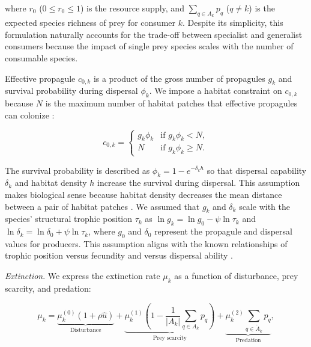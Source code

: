 \documentclass[11pt, class=article, crop=false]{standalone}
\begin{document}
where $r_0$ ($0 \le r_0 \le 1$) is the resource supply, and $\sum_{q \in A_{k}} p_{q}$ ($q \ne k$) is the expected species richness of prey for consumer $k$.
Despite its simplicity, this formulation naturally accounts for the trade-off between specialist and generalist consumers because the impact of single prey species scales with the number of consumable species.

Effective propagule $c_{0,k}$ is a product of the gross number of propagules $g_k$ and survival probability during dispersal $\phi_k$.
We impose a habitat constraint on $c_{0,k}$ because $N$ is the maximum number of habitat patches that effective propagules can colonize \citep{takimoto_effects_2012, terui_spatial_2019}:

\begin{equation}
    c_{0, k} = 
    \begin{cases}
        g_k \phi_k & \text{if $g_k \phi_k < N$},\\
        N & \text{if $g_k \phi_k \ge N$}.
    \end{cases}
    \label{eq:c0-prod}
\end{equation}

The survival probability is described as $\phi_k = 1 - e^{-\delta_k h}$ so that dispersal capability $\delta_k$ and habitat density $h$ increase the survival during dispersal.
This assumption makes biological sense because habitat density decreases the mean distance between a pair of habitat patches \citep{terui_spatial_2019}.
We assumed that $g_k$ and $\delta_k$ scale with the species' structural trophic position $\tau_k$ as $\ln g_k = \ln g_0 - \psi \ln \tau_k$ and $\ln \delta_k = \ln \delta_0 + \psi \ln \tau_k$, where $g_0$ and $\delta_0$ represent the propagule and dispersal values for producers.
This assumption aligns with the known relationships of trophic position versus fecundity and versus dispersal ability \citep{mccann_dynamics_2005}.

\textit{Extinction}. We express the extinction rate $\mu_k$ as a function of disturbance, prey scarcity, and predation:

\begin{equation}
    \mu_{k} = 
        \underbrace{\mu_{k}^{(0)} (1 + \rho \hat{u})}_{\text{Disturbance}} + 
        \underbrace{\mu_{k}^{(1)} \left(1 - \frac{1}{|A_{k}|}\sum_{q\in A_{k}} p_{q}\right)}_{\text{Prey scarcity}} + 
        \underbrace{\mu_{k}^{(2)} \sum_{q \in \tilde{A}_{k}} p_{q}}_{\text{Predation}},
    \label{eq:extn}    
\end{equation}
\end{document}
